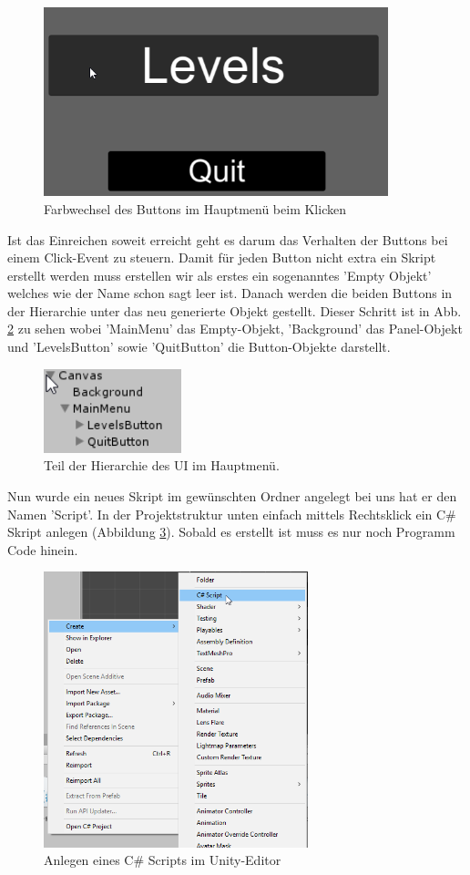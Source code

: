   \begin{figure}[H]
  	\centering
  	\includegraphics[width=10cm]{images/ButtonsClicked.png}
  	\caption{Farbwechsel des Buttons im Hauptmenü beim Klicken}
  	\label{ButtonClicked}
  \end{figure}

Ist das Einreichen soweit erreicht geht es darum das Verhalten der Buttons bei einem Click-Event zu steuern. Damit für jeden Button nicht extra ein Skript erstellt werden muss erstellen wir als erstes ein sogenanntes 'Empty Objekt' welches wie der Name schon sagt leer ist. Danach werden die beiden Buttons in der Hierarchie unter das neu generierte Objekt gestellt. Dieser Schritt ist in Abb. \ref{MainMenuEmpty} zu sehen wobei 'MainMenu' das Empty-Objekt, 'Background' das Panel-Objekt und 'LevelsButton' sowie 'QuitButton' die Button-Objekte darstellt.

\begin{figure}[H]
	\includegraphics[width=4cm]{images/MainMenuEmpty.png}
	\caption{Teil der Hierarchie des UI im Hauptmenü.}
	\label{MainMenuEmpty}
\end{figure}
Nun wurde ein neues Skript im gewünschten Ordner angelegt bei uns hat er den Namen 'Script'. In der Projektstruktur unten einfach mittels Rechtsklick ein C\# Skript anlegen (Abbildung \ref{addScript}). Sobald es erstellt ist muss es nur noch Programm Code hinein.

\begin{figure}[H]
	\includegraphics[height=8cm]{images/addScript.png}
	\caption{Anlegen eines C\# Scripts im Unity-Editor}
	\label{addScript}
\end{figure}

